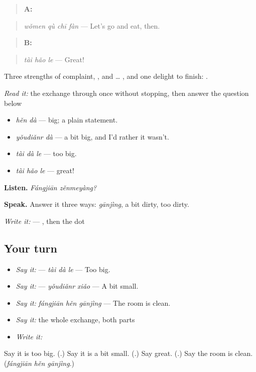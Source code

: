 \begin{quote}
\textbf{A:} 
\end{quote}

\begin{quote}
\emph{wǒmen qù chī fàn} — Let's go and eat, then.
\end{quote}

\begin{quote}
\textbf{B:} 
\end{quote}

\begin{quote}
\emph{tài hǎo le} — Great!
\end{quote}

Three strengths of complaint, ,  and  … , and one delight to finish: .

\begin{tcolorbox}[breakable,skin=enhanced,colback=orange!6,colframe=orange!45!black,boxrule=0.5pt,arc=1mm,left=6pt,right=6pt,top=4pt,bottom=4pt,fonttitle=\bfseries,title={Read this}]
\emph{Read it:} the exchange through once without stopping, then answer the question below
\end{tcolorbox}

\begin{grammarlens}[title={What you've built — three strengths}]
\begin{itemize}
\raggedright
  \item \textbf{} \emph{hěn dà} — big; a plain statement.
  \item \textbf{} \emph{yǒudiǎnr dà} — a bit big, and I'd rather it wasn't.
  \item \textbf{} \emph{tài dà le} — too big.
  \item \textbf{} \emph{tài hǎo le} — great!
\end{itemize}

\textbf{Listen.} \emph{Fángjiān zěnmeyàng?}

\textbf{Speak.} Answer it three ways: \emph{gānjìng}, a bit dirty, too dirty.

\emph{Write it:}  — , then the dot
\end{grammarlens}

\subsection*{Your turn}
\begin{itemize}
\raggedright
  \item \emph{Say it:}  — \emph{tài dà le} — Too big.
  \item \emph{Say it:}  — \emph{yǒudiǎnr xiǎo} — A bit small.
  \item \emph{Say it:} \emph{fángjiān hěn gānjìng} — The room is clean.
  \item \emph{Say it:} the whole exchange, both parts
  \item \emph{Write it:} 
\end{itemize}

\begin{tcolorbox}[breakable,colback=teal!4,colframe=teal!35!black,title={Before you move on}]
Say it is too big. (\textbf{}.) Say it is a bit small. (\textbf{}.) Say great. (\textbf{}.) Say the room is clean. (\emph{fángjiān hěn gānjìng}.)
\end{tcolorbox}
